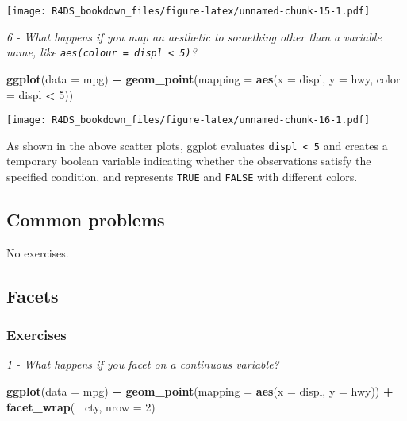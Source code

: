 \documentclass[]{article}
\newenvironment{Shaded}{\begin{snugshade}}{\end{snugshade}}
\newcommand{\KeywordTok}[1]{\textcolor[rgb]{0.13,0.29,0.53}{\textbf{#1}}}
\newcommand{\DataTypeTok}[1]{\textcolor[rgb]{0.13,0.29,0.53}{#1}}
\newcommand{\DecValTok}[1]{\textcolor[rgb]{0.00,0.00,0.81}{#1}}
\newcommand{\StringTok}[1]{\textcolor[rgb]{0.31,0.60,0.02}{#1}}
\newcommand{\OperatorTok}[1]{\textcolor[rgb]{0.81,0.36,0.00}{\textbf{#1}}}
\newcommand{\NormalTok}[1]{#1}
\theoremstyle{definition}
\theoremstyle{definition}
\theoremstyle{definition}
\theoremstyle{remark}
\begin{document}
\texttt{[image: R4DS\_bookdown\_files/figure-latex/unnamed-chunk-15-1.pdf]}

\emph{6 - What happens if you map an aesthetic to something other than a
variable name, like \texttt{aes(colour\ =\ displ\ \textless{}\ 5)}?}

\begin{Shaded}
\begin{Highlighting}[]
\KeywordTok{ggplot}\NormalTok{(}\DataTypeTok{data =}\NormalTok{ mpg) }\OperatorTok{+}
\StringTok{  }\KeywordTok{geom_point}\NormalTok{(}\DataTypeTok{mapping =} \KeywordTok{aes}\NormalTok{(}\DataTypeTok{x =}\NormalTok{ displ, }\DataTypeTok{y =}\NormalTok{ hwy, }\DataTypeTok{color =}\NormalTok{ displ }\OperatorTok{<}\StringTok{ }\DecValTok{5}\NormalTok{))}
\end{Highlighting}
\end{Shaded}

\texttt{[image: R4DS\_bookdown\_files/figure-latex/unnamed-chunk-16-1.pdf]}

As shown in the above scatter plots, ggplot evaluates
\texttt{displ\ \textless{}\ 5} and creates a temporary boolean variable
indicating whether the observations satisfy the specified condition, and
represents \texttt{TRUE} and \texttt{FALSE} with different colors.

\subsection{Common problems}\label{common-problems}

No exercises.

\subsection{Facets}\label{facets}

\subsubsection{Exercises}\label{exercises-2}

\emph{1 - What happens if you facet on a continuous variable?}

\begin{Shaded}
\begin{Highlighting}[]
\KeywordTok{ggplot}\NormalTok{(}\DataTypeTok{data =}\NormalTok{ mpg) }\OperatorTok{+}\StringTok{ }
\StringTok{  }\KeywordTok{geom_point}\NormalTok{(}\DataTypeTok{mapping =} \KeywordTok{aes}\NormalTok{(}\DataTypeTok{x =}\NormalTok{ displ, }\DataTypeTok{y =}\NormalTok{ hwy)) }\OperatorTok{+}\StringTok{ }
\StringTok{  }\KeywordTok{facet_wrap}\NormalTok{(}\OperatorTok{~}\StringTok{ }\NormalTok{cty, }\DataTypeTok{nrow =} \DecValTok{2}\NormalTok{)}
\end{Highlighting}
\end{Shaded}
\end{document}
